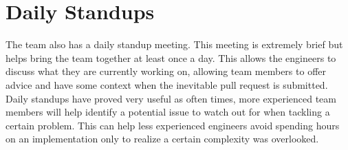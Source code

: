 \section{Daily Standups}
The \team{} team also has a daily standup meeting. This meeting is extremely brief but helps bring the team together at least once a day. This allows the engineers to discuss what they are currently working on, allowing team members to offer advice and have some context when the inevitable pull request is submitted. Daily standups have proved very useful as often times, more experienced team members will help identify a potential issue to watch out for when tackling a certain problem. This can help less experienced engineers avoid spending hours on an implementation only to realize a certain complexity was overlooked. 
